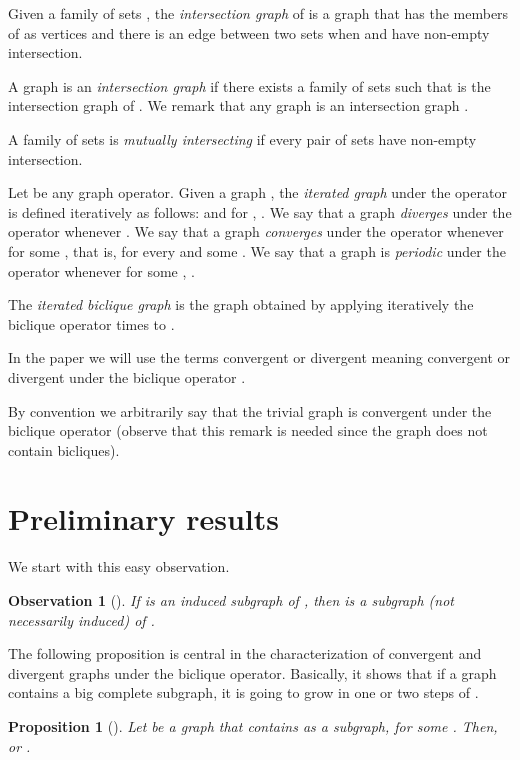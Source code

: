 \documentclass[12pt]{article}
\newtheorem{observation}[theorem]{Observation}
\newtheorem{proposition}[theorem]{Proposition}
\begin{document}
Given a family of sets , the \emph{intersection graph} of  is a graph that has the members of 
 as vertices and there is an edge between two sets  when  and  have non-empty intersection.

A graph  is an \emph{intersection graph} if there exists a family of sets  such that  is the intersection 
graph of . We remark that any graph is an intersection graph \cite{Szpilrajn-MarczewskiFM1945}. 

A family of sets  is \emph{mutually intersecting} if every pair of sets  have non-empty intersection.

Let  be any graph operator. Given a graph , the \emph{iterated graph} under the operator  is defined iteratively as 
follows:  and for , . We say that a graph  \emph{diverges} under the operator  whenever 
. We say that a graph  \emph{converges} under the operator  whenever 
 for some , that is,  for every  and some . We say that a graph  is \emph{periodic} under 
the operator  whenever  for some , . 

The \emph{iterated biclique graph}  is the graph obtained by applying iteratively the biclique operator  times to . 

In the paper we will use the terms convergent or divergent meaning convergent or divergent under the biclique operator .

By convention we arbitrarily say that the trivial graph  is convergent under the biclique operator (observe that this remark is needed 
since the graph  does not contain bicliques).


\section{Preliminary results}\label{resultsantes}

We start with this easy observation.

\begin{observation}[\cite{marinayo}]\label{l3}
If  is an induced subgraph of , then  is a subgraph (not necessarily induced) of .
\end{observation}

The following proposition is central in the characterization of convergent and divergent graphs under the biclique operator. Basically, it shows that if a graph contains a big complete subgraph, it is going to grow in one or two steps of .

\begin{proposition}[\cite{marinayo}]
Let  be a graph that contains  as a subgraph, for some . Then,  or 
.
\end{proposition}
\end{document}
